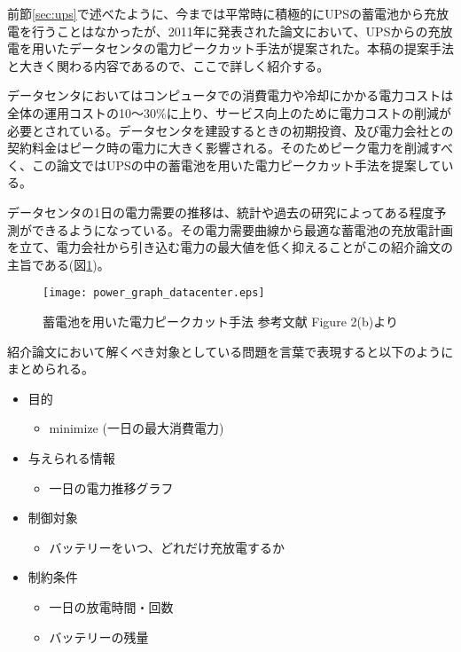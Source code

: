 前節\ref{sec:ups}で述べたように、今までは平常時に積極的にUPSの蓄電池から充放電を行うことはなかったが、2011年に発表された論文\cite{Govindan:2011:BLT:2024723.2000105}において、UPSからの充放電を用いたデータセンタの電力ピークカット手法が提案された。本稿の提案手法と大きく関わる内容であるので、ここで詳しく紹介する。

データセンタにおいてはコンピュータでの消費電力や冷却にかかる電力コストは全体の運用コストの10〜30\%に上り、サービス向上のために電力コストの削減が必要とされている。データセンタを建設するときの初期投資、及び電力会社との契約料金はピーク時の電力に大きく影響される。そのためピーク電力を削減すべく、この論文ではUPSの中の蓄電池を用いた電力ピークカット手法を提案している。

データセンタの1日の電力需要の推移は、統計や過去の研究によってある程度予測ができるようになっている。その電力需要曲線から最適な蓄電池の充放電計画を立て、電力会社から引き込む電力の最大値を低く抑えることがこの紹介論文の主旨である(図\ref{fig:power_graph_datacenter})。
\begin{figure}[t]
 \begin{center}
  \texttt{[image: power\_graph\_datacenter.eps]}
 \end{center}
 \caption{蓄電池を用いた電力ピークカット手法 参考文献\cite{Govindan:2011:BLT:2024723.2000105} Figure 2(b)より}
 \label{fig:power_graph_datacenter}
\end{figure}

紹介論文において解くべき対象としている問題を言葉で表現すると以下のようにまとめられる。

\begin{itemize}
  \item 目的
    \begin{itemize}
      \item minimize (一日の最大消費電力)
    \end{itemize}
  \item 与えられる情報
    \begin{itemize}
      \item 一日の電力推移グラフ
    \end{itemize}
  \item 制御対象
    \begin{itemize}
      \item バッテリーをいつ、どれだけ充放電するか
    \end{itemize}
  \item 制約条件
    \begin{itemize}
      \item 一日の放電時間・回数
      \item バッテリーの残量
    \end{itemize}
\end{itemize}


